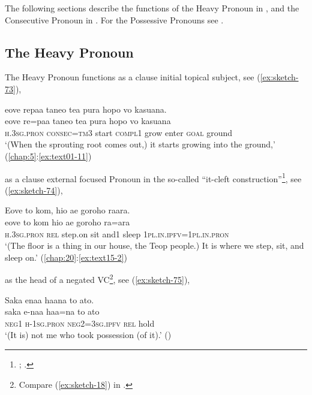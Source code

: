\documentclass[output=paper]{langscibook}
\begin{document}
The following sections describe the functions of the Heavy Pronoun in , and the Consecutive Pronoun in . For the Possessive Pronouns see . 

\newpage
\subsection{The Heavy Pronoun}\label{sec:heavypron}

The Heavy Pronoun functions as a clause initial topical subject, see (\ref{ex:sketch-73}),

\ea\label{ex:sketch-73}
    eove repaa taneo tea pura hopo vo kasuana.\\
    \gll eove	re=paa	taneo	tea	pura	hopo	vo	kasuana\\
    \textsc{h}.3\textsc{sg}.\textsc{pron}	\textsc{consec}=\textsc{tm}3	start	\textsc{compl}1	grow	enter	\textsc{goal}	ground\\
    \glt `(When the sprouting root comes out,) it starts growing into the ground,' (\ref{chap:5}:\ref{ex:text01-11})
\z

\noindent as a clause external focused Pronoun in the so-called ``it-cleft construction''\footnote{\textcite[133, 149, 152, 155]{Andrews:2007eq}; \textcite[17, 70--71]{Lambrecht:1994od}.}, see (\ref{ex:sketch-74}),

\ea\label{ex:sketch-74}
    Eove to kom, hio ae goroho raara.\\
    \gll eove	to	kom	hio	ae	goroho	ra=ara\\
    \textsc{h}.3\textsc{sg}.\textsc{pron}	\textsc{rel}	step.on	sit	and1	sleep	1\textsc{pl}.\textsc{in}.\textsc{ipfv}=1\textsc{pl}.\textsc{in}.\textsc{pron}\\
    \glt `(The floor is a thing in our house, the Teop people.) It is where we step, sit, and sleep on.' (\ref{chap:20}:\ref{ex:text15-2})
\z

\noindent as the head of a negated VC\footnote{Compare (\ref{ex:sketch-18}) in .}, see (\ref{ex:sketch-75}),

\ea\label{ex:sketch-75}
    Saka enaa haana to ato.\\
    \gll saka e-naa haa=na to ato\\
    \textsc{neg}1 \textsc{h}-1\textsc{sg}.\textsc{pron} \textsc{neg}2=3\textsc{sg}.\textsc{ipfv} \textsc{rel} hold\\
    \glt `(It is) not me who took possession (of it).' (\cite[22]{Siarive:2014gg})
\z
\end{document}
